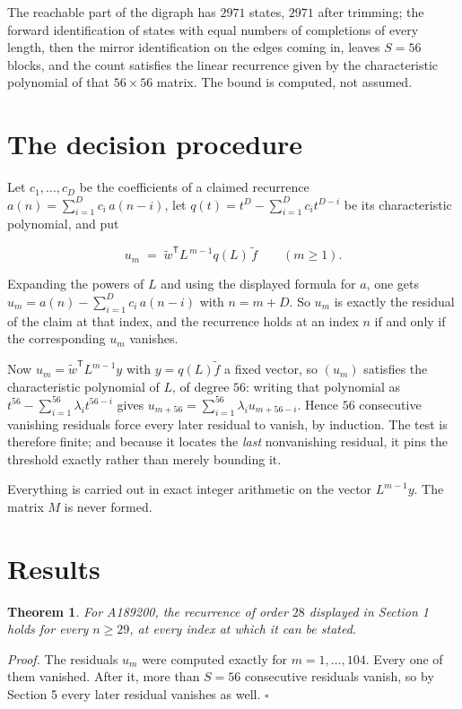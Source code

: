 \documentclass[11pt]{article}
\newtheorem{theorem}{Theorem}
\theoremstyle{definition}
\begin{document}
The reachable part of the digraph has $2971$ states, $2971$ after trimming; the forward identification of states with equal numbers of completions of every length, then the mirror identification on the edges coming in, leaves $S = 56$ blocks, and the count satisfies the linear recurrence given by the characteristic polynomial of that $56\times56$ matrix. The bound is computed, not assumed.

\section{The decision procedure}

Let $c_1,\dots,c_D$ be the coefficients of a claimed recurrence $a(n) = \sum_{i=1}^{D} c_i\,a(n-i)$, let $q(t) = t^{D} - \sum_{i=1}^{D} c_i t^{D-i}$ be its characteristic polynomial, and put

\[u_m \;=\; \tilde w^{\mathsf T} L^{\,m-1} q(L)\,\tilde f \qquad (m \ge 1).\]

Expanding the powers of $L$ and using the displayed formula for $a$, one gets $u_m = a(n) - \sum_{i=1}^{D} c_i\,a(n-i)$ with $n = m + D$. So $u_m$ is exactly the residual of the claim at that index, and the recurrence holds at an index $n$ if and only if the corresponding $u_m$ vanishes.

Now $u_m = \tilde w^{\mathsf T} L^{m-1} y$ with $y = q(L)\tilde f$ a fixed vector, so $(u_m)$ satisfies the characteristic polynomial of $L$, of degree $56$: writing that polynomial as $t^{56} - \sum_{i=1}^{56} \lambda_i t^{56-i}$ gives $u_{m+56} = \sum_{i=1}^{56} \lambda_i u_{m+56-i}$. Hence $56$ consecutive vanishing residuals force every later residual to vanish, by induction. The test is therefore finite; and because it locates the {\itshape last} nonvanishing residual, it pins the threshold exactly rather than merely bounding it.

Everything is carried out in exact integer arithmetic on the vector $L^{m-1}y$. The matrix $M$ is never formed.

\section{Results}

\begin{theorem} For A189200, the recurrence of order $28$ displayed in Section 1 holds for every $n \ge 29$, at every index at which it can be stated.\end{theorem}

{\itshape Proof.} The residuals $u_m$ were computed exactly for $m = 1,\dots,104$. Every one of them vanished. After it, more than $S = 56$ consecutive residuals vanish, so by Section 5 every later residual vanishes as well. $\square$
\end{document}
